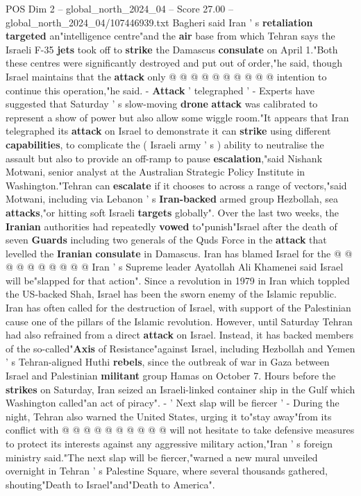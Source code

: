 \begin{textsample}{POS Dim 2 – global\_north\_2024\_04 – Score 27.00 – global\_north\_2024\_04/107446939.txt}
Bagheri said Iran ' s \textbf{retaliation} \textbf{targeted} an"intelligence centre"and the \textbf{air} base from which Tehran says the Israeli F-35 \textbf{jets} took off to \textbf{strike} the Damascus \textbf{consulate} on April 1."Both these centres were significantly destroyed and put out of order,"he said, though Israel maintains that the \textbf{attack} only @ @ @ @ @ @ @ @ @ @ intention to continue this operation,"he said. - \textbf{Attack} ' telegraphed ' - Experts have suggested that Saturday ' s slow-moving \textbf{drone} \textbf{attack} was calibrated to represent a show of power but also allow some wiggle room."It appears that Iran telegraphed its \textbf{attack} on Israel to demonstrate it can \textbf{strike} using different \textbf{capabilities}, to complicate the ( Israeli army ' s ) ability to neutralise the assault but also to provide an off-ramp to pause \textbf{escalation},"said Nishank Motwani, senior analyst at the Australian Strategic Policy Institute in Washington."Tehran can \textbf{escalate} if it chooses to across a range of vectors,"said Motwani, including via Lebanon ' s \textbf{Iran-backed} armed group Hezbollah, sea \textbf{attacks},"or hitting soft Israeli \textbf{targets} globally".
Over the last two weeks, the \textbf{Iranian} authorities had repeatedly \textbf{vowed} to"punish"Israel after the death of seven \textbf{Guards} including two generals of the Quds Force in the \textbf{attack} that levelled the \textbf{Iranian} \textbf{consulate} in Damascus.
Iran has blamed Israel for the @ @ @ @ @ @ @ @ @ @ Iran ' s Supreme leader Ayatollah Ali Khamenei said Israel will be"slapped for that action".
Since a revolution in 1979 in Iran which toppled the US-backed Shah, Israel has been the sworn enemy of the Islamic republic.
Iran has often called for the destruction of Israel, with support of the Palestinian cause one of the pillars of the Islamic revolution.
However, until Saturday Tehran had also refrained from a direct \textbf{attack} on Israel.
Instead, it has backed members of the so-called"\textbf{Axis} of Resistance"against Israel, including Hezbollah and Yemen ' s Tehran-aligned Huthi \textbf{rebels}, since the outbreak of war in Gaza between Israel and Palestinian \textbf{militant} group Hamas on October 7.
Hours before the \textbf{strikes} on Saturday, Iran seized an Israeli-linked container ship in the Gulf which Washington called"an act of piracy". - ' Next slap will be fiercer ' - During the night, Tehran also warned the United States, urging it to"stay away"from its conflict with @ @ @ @ @ @ @ @ @ @ will not hesitate to take defensive measures to protect its interests against any aggressive military action,"Iran ' s foreign ministry said."The next slap will be fiercer,"warned a new mural unveiled overnight in Tehran ' s Palestine Square, where several thousands gathered, shouting"Death to Israel"and"Death to America".

\end{textsample}
